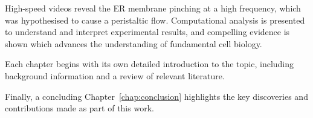 High-speed videos reveal the ER membrane pinching at a high frequency, which was hypothesised to cause a peristaltic flow. 
Computational analysis is presented to understand and interpret experimental results, and compelling evidence is shown which advances the understanding of fundamental cell biology. 

Each chapter begins with its own detailed introduction to the topic, including background information and a review of relevant literature. 

Finally, a concluding Chapter~\ref{chap:conclusion} highlights the key discoveries and contributions made as part of this work.